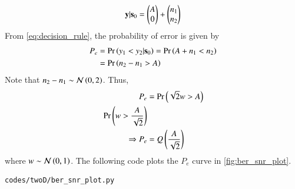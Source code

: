 \begin{enumerate}[label=\thesection.\arabic*.,ref=\thesection.\theenumi]
\begin{align}
\mathbf{y}|\mathbf{s}_0 = \begin{pmatrix} A \\ 0 \end{pmatrix} + \begin{pmatrix} n_1 \\ n_2 \end{pmatrix}
\end{align}
From \ref{eq:decision_rule}, the probability of error is given by 
\begin{align}
P_e &= \Pr\left(y_1 < y_2 |\mathbf{s}_0\right) = \Pr\left(A+n_1 < n_2\right)\\
&= \Pr\left(n_2 - n_1 > A\right)
\end{align}
Note that $n_2 - n_1 \sim \mathcal{N}\left(0,2\right)$. Thus,
\begin{align}
P_e &= \Pr\left(\sqrt{2}w > A\right)\\
\Pr\left(w > \dfrac{A}{\sqrt{2}}\right)\\
\Rightarrow P_e &= Q\left(\frac{A}{\sqrt{2}}\right)
\end{align}
where $w \sim \mathcal{N}\left(0,1\right)$. The following code plots the $P_e$ curve in \ref{fig:ber_snr_plot}.
\begin{lstlisting}
codes/twoD/ber_snr_plot.py
\end{lstlisting}
\end{enumerate}
